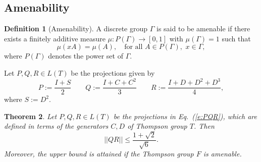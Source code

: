 \documentclass{amsart}
\newtheorem{thm}{Theorem}[section]
\theoremstyle{definition}
\newtheorem{defn}[thm]{Definition}  %
\begin{document}
\subsection{Amenability}
\begin{defn}[Amenability]
A discrete group $\Gamma$ is said to be amenable if there exists a finitely additive measure 
$\mu:P(\Gamma)\to[0,1]$ with $\mu(\Gamma)=1$ such that
$$\mu(xA)=\mu(A),\quad \text{for all } A\in P(\Gamma),\,\,  x\in\Gamma,$$
where $P(\Gamma)$ denotes the power set of $\Gamma$.
\end{defn}
$ $\\
\noindent
Let $P,Q,R\in L(T)$ be the projections given by
\begin{equation}\label{e:PQR}
P:=\frac{I+S}{2}\qquad Q:=\frac{I+C+C^2}{3}\qquad R:=\frac{I+D+D^2+D^3}{4},
\end{equation}
where $S:=D^2$.



\begin{thm}\label{t:QRleQP}
Let $P,Q,R\in L(T)$ be the projections in Eq.~(\ref{e:PQR}), which are defined in terms of the generators $C,D$ of Thompson group $T$.
Then
$$||QR||\le \frac{1+\sqrt{2}}{\sqrt{6}}.$$
Moreover, the upper bound is attained if the Thompson group $F$ is amenable.
\end{thm}
\end{document}

